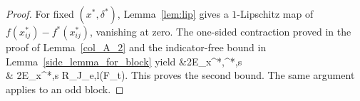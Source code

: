 \documentclass[twoside,11pt]{article}
\newenvironment{revision}{\color{revisionred}}{}
\begin{document}
\begin{proof}
\begin{revision}
For fixed $(x^*,\delta^*)$, Lemma~\ref{lem:lip} gives a
$1$-Lipschitz map of $f(x_{ij}^*)-f^*(x_{ij}^*)$, vanishing at zero.
The one-sided contraction proved in the proof of Lemma~\ref{col_A_2}
and the indicator-free bound in Lemma~\ref{side_lemma_for_block} yield
\bea
&2\mathbb E_{x^*,\delta^*,s}\left[
\sup_{f-f^*\in\mathcal F_t}\frac1n
\sum_{i\in\mathcal J_{e,l}}\frac1{m_i}\sum_{j=1}^{m_i}
s_{ij}r_{ij}^*(f)\right]\\
&\,\leq\,2\mathbb E_{x^*,s}\left[
\sup_{h\in\mathcal F_t}\frac1n
\sum_{i\in\mathcal J_{e,l}}\frac1{m_i}\sum_{j=1}^{m_i}
s_{ij}h(x_{ij}^*)\right]
\,\leq\,R_{\mathcal J_{e,l}}(\mathcal F_t).
\bea
This proves the second bound. The same argument applies to an odd block.
\end{revision}
\end{proof}
\end{document}
